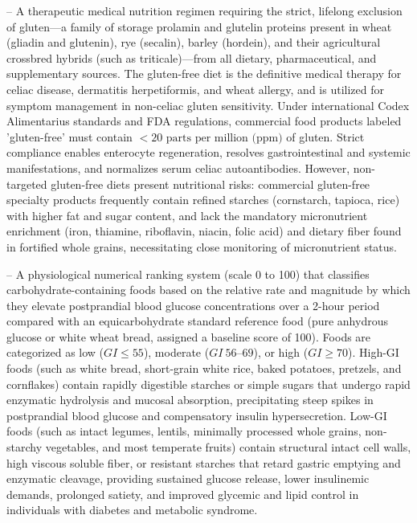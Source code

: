 -- A therapeutic medical nutrition regimen requiring the strict, lifelong exclusion of gluten---a family of storage prolamin and glutelin proteins present in wheat (gliadin and glutenin), rye (secalin), barley (hordein), and their agricultural crossbred hybrids (such as triticale)---from all dietary, pharmaceutical, and supplementary sources. The gluten-free diet is the definitive medical therapy for celiac disease, dermatitis herpetiformis, and wheat allergy, and is utilized for symptom management in non-celiac gluten sensitivity. Under international Codex Alimentarius standards and FDA regulations, commercial food products labeled 'gluten-free' must contain $<20\text{ parts per million (ppm)}$ of gluten. Strict compliance enables enterocyte regeneration, resolves gastrointestinal and systemic manifestations, and normalizes serum celiac autoantibodies. However, non-targeted gluten-free diets present nutritional risks: commercial gluten-free specialty products frequently contain refined starches (cornstarch, tapioca, rice) with higher fat and sugar content, and lack the mandatory micronutrient enrichment (iron, thiamine, riboflavin, niacin, folic acid) and dietary fiber found in fortified whole grains, necessitating close monitoring of micronutrient status.

-- A physiological numerical ranking system (scale 0 to 100) that classifies carbohydrate-containing foods based on the relative rate and magnitude by which they elevate postprandial blood glucose concentrations over a 2-hour period compared with an equicarbohydrate standard reference food (pure anhydrous glucose or white wheat bread, assigned a baseline score of 100). Foods are categorized as low ($GI \le 55$), moderate ($GI\ 56\text{--}69$), or high ($GI \ge 70$). High-GI foods (such as white bread, short-grain white rice, baked potatoes, pretzels, and cornflakes) contain rapidly digestible starches or simple sugars that undergo rapid enzymatic hydrolysis and mucosal absorption, precipitating steep spikes in postprandial blood glucose and compensatory insulin hypersecretion. Low-GI foods (such as intact legumes, lentils, minimally processed whole grains, non-starchy vegetables, and most temperate fruits) contain structural intact cell walls, high viscous soluble fiber, or resistant starches that retard gastric emptying and enzymatic cleavage, providing sustained glucose release, lower insulinemic demands, prolonged satiety, and improved glycemic and lipid control in individuals with diabetes and metabolic syndrome.

